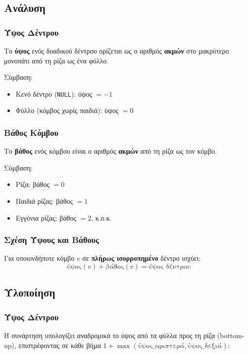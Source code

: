 \documentclass[a4paper,12pt]{article}
\begin{document}
	\subsection{Ανάλυση}
	
	\subsubsection{Ύψος Δέντρου}
	Το \textbf{ύψος} ενός δυαδικού δέντρου ορίζεται ως ο αριθμός \textbf{ακμών} 
	στο μακρύτερο μονοπάτι από τη ρίζα ως ένα φύλλο.
	
	Σύμβαση:
	\begin{itemize}
		\item Κενό δέντρο (\texttt{NULL}): ύψος $= -1$
		\item Φύλλο (κόμβος χωρίς παιδιά): ύψος $= 0$
	\end{itemize}
	
	\subsubsection{Βάθος Κόμβου}
	Το \textbf{βάθος} ενός κόμβου είναι ο αριθμός \textbf{ακμών} από τη ρίζα 
	ως τον κόμβο.
	
	Σύμβαση:
	\begin{itemize}
		\item Ρίζα: βάθος $= 0$
		\item Παιδιά ρίζας: βάθος $= 1$
		\item Εγγόνια ρίζας: βάθος $= 2$, κ.ο.κ.
	\end{itemize}
	
	\subsubsection{Σχέση Ύψους και Βάθους}
	Για οποιονδήποτε κόμβο $v$ σε \textbf{πλήρως ισορροπημένο} δέντρο ισχύει:
	$$\text{ύψος}(v) + \text{βάθος}(v) = \text{ύψος δέντρου}$$
	
	\subsection{Υλοποίηση}
	
	\subsubsection{Ύψος Δέντρου}
	Η συνάρτηση υπολογίζει αναδρομικά το ύψος από τα φύλλα προς τη ρίζα 
	(bottom-up), επιστρέφοντας σε κάθε βήμα $1 + \max(\text{ύψος\_αριστερά}, 
	\text{ύψος\_δεξιά})$:
	
\end{document}
